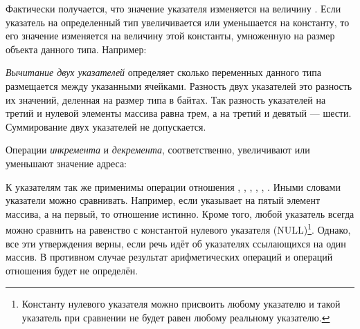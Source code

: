 Фактически получается, что значение указателя изменяется на величину . Если указатель на
определенный тип увеличивается или уменьшается на константу, то его значение изменяется на величину этой константы,
умноженную на размер объекта данного типа. Например:










\emph{Вычитание двух указателей} определяет сколько переменных данного типа размещается между указанными
ячейками. Разность двух указателей это разность их значений, деленная на размер типа в байтах. Так разность указателей
на третий и нулевой элементы массива равна трем, а на третий и девятый --- шести. Суммирование двух указателей не
допускается.

Операции \emph{инкремента} и \emph{декремента}, соответственно, увеличивают или уменьшают
значение адреса:







К указателям так же применимы {операции отношения} \Sys{==}, \Sys{!=},
\Sys{{\textless}}, \Sys{{\textgreater}}, \Sys{{\textless}=},
\Sys{{\textgreater}=}. Иными словами указатели можно сравнивать. Например, если 
указывает на пятый элемент массива, а  на первый, то отношение 
истинно. Кроме того, любой указатель всегда можно сравнить на равенство с константой нулевого указателя
(NULL)\footnote{Константу нулевого указателя можно присвоить любому указателю и такой указатель при сравнении не будет
равен любому реальному указателю.}. Однако, все эти утверждения верны, если речь идёт об указателях ссылающихся на один
массив. В противном случае результат арифметических операций и операций отношения будет не определён.

